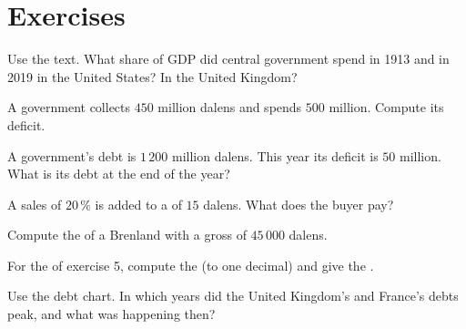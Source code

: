 \section{Exercises}

\begin{exercise}[$\star$]\label{exo:g8:taxes-and-public-spending:1}
Use the text. What share of GDP did central government spend in 1913 and in 2019 in the United States?
In the United Kingdom?
\end{exercise}

\begin{exercise}[$\star$]\label{exo:g8:taxes-and-public-spending:2}
A government collects $450$ million dalens and spends $500$ million. Compute its deficit.
\end{exercise}

\begin{exercise}[$\star$]\label{exo:g8:taxes-and-public-spending:3}
A government's debt is $1\,200$ million dalens. This year its deficit is $50$ million. What is its debt
at the end of the year?
\end{exercise}

\begin{exercise}[$\star$]\label{exo:g8:taxes-and-public-spending:4}
A sales  of $20\,\%$ is added to a  of $15$ dalens. What does the buyer pay?
\end{exercise}

\begin{exercise}[$\star\star$]\label{exo:g8:taxes-and-public-spending:5}
Compute the  of a Brenland  with a gross  of $45\,000$ dalens.
\end{exercise}

\begin{exercise}[$\star\star$]\label{exo:g8:taxes-and-public-spending:6}
For the  of exercise 5, compute the  (to one decimal) and give the .
\end{exercise}

\begin{exercise}[$\star\star$]\label{exo:g8:taxes-and-public-spending:7}
Use the debt chart. In which years did the United Kingdom's and France's debts peak, and what was
happening then?
\end{exercise}


